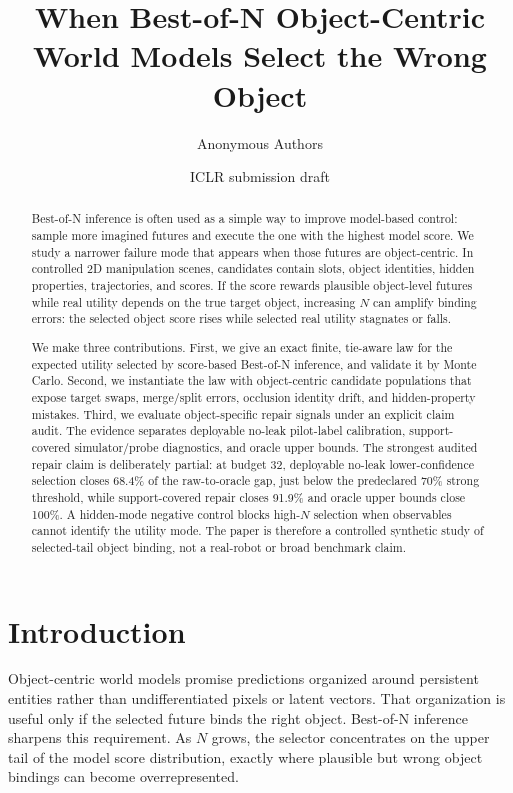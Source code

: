 \documentclass[10pt]{article}
\title{\vspace{-1.0em}When Best-of-N Object-Centric World Models Select the Wrong Object}
\author{Anonymous Authors}
\date{ICLR submission draft}
\begin{document}
\maketitle

\begin{abstract}
Best-of-N inference is often used as a simple way to improve model-based control: sample more imagined futures and execute the one with the highest model score. We study a narrower failure mode that appears when those futures are object-centric. In controlled 2D manipulation scenes, candidates contain slots, object identities, hidden properties, trajectories, and scores. If the score rewards plausible object-level futures while real utility depends on the true target object, increasing $N$ can amplify binding errors: the selected object score rises while selected real utility stagnates or falls.

We make three contributions. First, we give an exact finite, tie-aware law for the expected utility selected by score-based Best-of-N inference, and validate it by Monte Carlo. Second, we instantiate the law with object-centric candidate populations that expose target swaps, merge/split errors, occlusion identity drift, and hidden-property mistakes. Third, we evaluate object-specific repair signals under an explicit claim audit. The evidence separates deployable no-leak pilot-label calibration, support-covered simulator/probe diagnostics, and oracle upper bounds. The strongest audited repair claim is deliberately partial: at budget 32, deployable no-leak lower-confidence selection closes 68.4\% of the raw-to-oracle gap, just below the predeclared 70\% strong threshold, while support-covered repair closes 91.9\% and oracle upper bounds close 100\%. A hidden-mode negative control blocks high-$N$ selection when observables cannot identify the utility mode. The paper is therefore a controlled synthetic study of selected-tail object binding, not a real-robot or broad benchmark claim.
\end{abstract}

\section{Introduction}

Object-centric world models promise predictions organized around persistent entities rather than undifferentiated pixels or latent vectors. That organization is useful only if the selected future binds the right object. Best-of-N inference sharpens this requirement. As $N$ grows, the selector concentrates on the upper tail of the model score distribution, exactly where plausible but wrong object bindings can become overrepresented.
\end{document}
